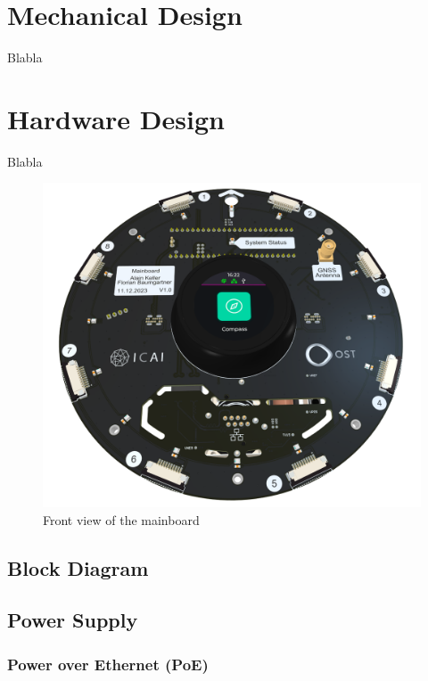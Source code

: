 \newpage
\section{Mechanical Design}
Blabla




\newpage
\section{Hardware Design}
Blabla

\begin{figure}
	\centering
	\includegraphics[width=1.0\textwidth]{images/6_design_final/Mainboard_Front_Display.png}
	\caption{Front view of the mainboard}
	\label{fig:mainboard_front}
\end{figure}




\subsection{Block Diagram}

\subsection{Power Supply}


\subsubsection{Power over Ethernet (PoE)}


